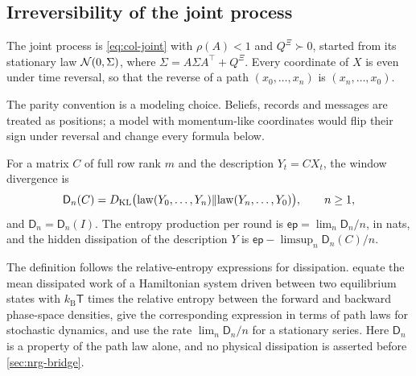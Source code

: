 \subsection{Irreversibility of the joint process}\label{sec:nrg-ep}

\begin{assumption}\label{ass:nrg-setting}
The joint process is \cref{eq:col-joint} with $\rho(A)<1$ and $Q^{\Xi}\succ0$, started from its stationary law $\mathcal{N}(0,\Sigma)$, where $\Sigma=A\Sigma A^\top+Q^{\Xi}$. Every coordinate of $X$ is even under time reversal, so that the reverse of a path $(x_0,\dots,x_n)$ is $(x_n,\dots,x_0)$.
\end{assumption}

The parity convention is a modeling choice. Beliefs, records and messages are treated as positions; a model with momentum-like coordinates would flip their sign under reversal and change every formula below.

\begin{definition}\label{def:nrg-ep}
For a matrix $C$ of full row rank $m$ and the description $Y_t=CX_t$, the window divergence is
\begin{equation}\label{eq:nrg-window}
\mathsf D_n(C)=D_{\mathrm{KL}}\bigl(\mathrm{law}(Y_0,\dots,Y_n)\Vert\mathrm{law}(Y_n,\dots,Y_0)\bigr),\qquad n\ge1,
\end{equation}
and $\mathsf D_n=\mathsf D_n(I)$. The entropy production per round is $\mathsf{ep}=\lim_n\mathsf D_n/n$, in nats, and the hidden dissipation of the description $Y$ is $\mathsf{ep}-\limsup_n\mathsf D_n(C)/n$.
\end{definition}

The definition follows the relative-entropy expressions for dissipation. \citet{kawai2007dissipation} equate the mean dissipated work of a Hamiltonian system driven between two equilibrium states with $k_{\mathrm B}\mathsf T$ times the relative entropy between the forward and backward phase-space densities, \citet{gomezmarin2007bounding} give the corresponding expression in terms of path laws for stochastic dynamics, and \citet{roldan2010estimating} use the rate $\lim_n\mathsf D_n/n$ for a stationary series. Here $\mathsf D_n$ is a property of the path law alone, and no physical dissipation is asserted before \cref{sec:nrg-bridge}.


